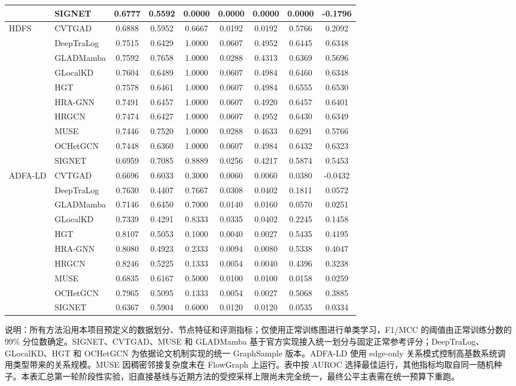 \begin{table}[t]
{\begin{tabular}{llccccccc}
 & SIGNET & 0.6777 & 0.5592 & 0.0000 & 0.0000 & 0.0000 & 0.0000 & -0.1796 \\
\midrule
\multirow{10}{*}{HDFS} & CVTGAD & 0.6888 & 0.5952 & 0.6667 & 0.0192 & 0.0192 & 0.5766 & 0.2092 \\
 & DeepTraLog & 0.7515 & 0.6429 & 1.0000 & 0.0607 & 0.4952 & 0.6445 & 0.6348 \\
 & GLADMamba & 0.7592 & 0.7658 & 1.0000 & 0.0288 & 0.4313 & 0.6369 & 0.5696 \\
 & GLocalKD & 0.7604 & 0.6489 & 1.0000 & 0.0607 & 0.4984 & 0.6460 & 0.6348 \\
 & HGT & 0.7578 & 0.6461 & 1.0000 & 0.0607 & 0.4984 & 0.6555 & 0.6530 \\
 & HRA-GNN & 0.7491 & 0.6457 & 1.0000 & 0.0607 & 0.4920 & 0.6457 & 0.6401 \\
 & HRGCN & 0.7474 & 0.6427 & 1.0000 & 0.0607 & 0.4952 & 0.6430 & 0.6349 \\
 & MUSE & 0.7446 & 0.7520 & 1.0000 & 0.0288 & 0.4633 & 0.6291 & 0.5766 \\
 & OCHetGCN & 0.7448 & 0.6360 & 1.0000 & 0.0607 & 0.4984 & 0.6432 & 0.6323 \\
 & SIGNET & 0.6959 & 0.7085 & 0.8889 & 0.0256 & 0.4217 & 0.5874 & 0.5453 \\
\midrule
\multirow{10}{*}{ADFA-LD} & CVTGAD & 0.6696 & 0.6033 & 0.3000 & 0.0060 & 0.0060 & 0.0380 & -0.0432 \\
 & DeepTraLog & 0.7630 & 0.4407 & 0.7667 & 0.0308 & 0.0402 & 0.1811 & 0.0572 \\
 & GLADMamba & 0.7146 & 0.6450 & 0.7000 & 0.0140 & 0.0160 & 0.0570 & 0.0251 \\
 & GLocalKD & 0.7339 & 0.4291 & 0.8333 & 0.0335 & 0.0402 & 0.2245 & 0.1458 \\
 & HGT & 0.8107 & 0.5053 & 0.1000 & 0.0040 & 0.0027 & 0.5435 & 0.4195 \\
 & HRA-GNN & 0.8080 & 0.4923 & 0.2333 & 0.0094 & 0.0080 & 0.5338 & 0.4047 \\
 & HRGCN & 0.8246 & 0.5225 & 0.1333 & 0.0054 & 0.0040 & 0.4396 & 0.3238 \\
 & MUSE & 0.6835 & 0.6167 & 0.5000 & 0.0100 & 0.0100 & 0.0158 & 0.0259 \\
 & OCHetGCN & 0.7965 & 0.5095 & 0.1333 & 0.0054 & 0.0027 & 0.5068 & 0.3885 \\
 & SIGNET & 0.6367 & 0.5904 & 0.6000 & 0.0120 & 0.0120 & 0.0535 & 0.0334 \\
\bottomrule
\end{tabular}%
}
\begin{minipage}{\textwidth}
\scriptsize
说明：所有方法沿用本项目预定义的数据划分、节点特征和评测指标；仅使用正常训练图进行单类学习，F1/MCC 的阈值由正常训练分数的 99\% 分位数确定。SIGNET、CVTGAD、MUSE 和 GLADMamba 基于官方实现接入统一划分与固定正常参考评分；DeepTraLog、GLocalKD、HGT 和 OCHetGCN 为依据论文机制实现的统一 GraphSample 版本。ADFA-LD 使用 edge-only 关系模式控制高基数系统调用类型带来的关系规模。MUSE 因稠密邻接复杂度未在 FlowGraph 上运行。表中按 AUROC 选择最佳运行，其他指标均取自同一随机种子。本表汇总第一轮阶段性实验，旧直接基线与近期方法的受控采样上限尚未完全统一，最终公平主表需在统一预算下重跑。
\end{minipage}
\end{table}
